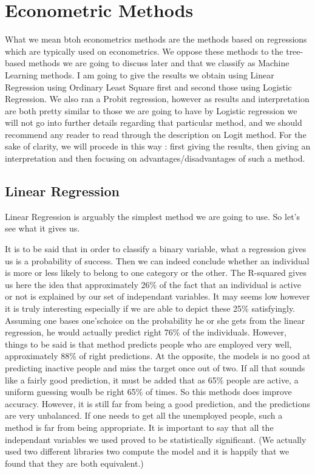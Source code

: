 \section{Econometric Methods}
What we mean btoh econometrics methods are the methods based on regressions which are typically used on econometrics. We oppose these methods to the tree-based methods we are going to discuss later and that we classify as Machine Learning methods.
I am going to give the results we obtain using Linear Regression using Ordinary Least Square first and second those using Logistic Regression. We also ran a Probit regression, however as results and interpretation are both pretty similar to those we are going to have by Logistic regression we will not go into further details regarding that particular method, and we should recommend any reader to read through the description on Logit method.
For the sake of clarity, we will procede in this way : first giving the results, then giving an interpretation and then focusing on advantages/disadvantages of such a method.

\subsection{Linear Regression}
Linear Regression is arguably the simplest method we are going to use. So let’s see what it gives us.


It is to be said that in order to classify a binary variable, what a regression gives us is a probability of success. Then we can indeed conclude whether an individual is more or less likely to belong to one category or the other.
The R-squared gives us here the idea that approximately 26\% of the fact that an individual is active or not is explained by our set of independant variables. It may seems low however it is truly interesting especially if we are able to depict these 25\% satisfyingly.
Assuming one bases one’schoice on the probability he or she gets from the linear regression, he would actually predict right 76\% of the individuals. However, things to be said is that method predicts people who are employed very well, approximately 88\% of right predictions. At the opposite, the models is no good at predicting inactive people and miss the target once out of two.
If all that sounds like a fairly good prediction, it must be added that as 65\% people are active, a uniform guessing woulb be right 65\% of times. So this methods does improve accuracy. However, it is still far from being a good prediction, and the predictions are very unbalanced. If one needs to get all the unemployed people, such a method is far from being appropriate.
It is important to say that all the independant variables we used proved to be statistically    significant.
(We actually used two different libraries two compute the model and it is happily that we found that they are both equivalent.)

